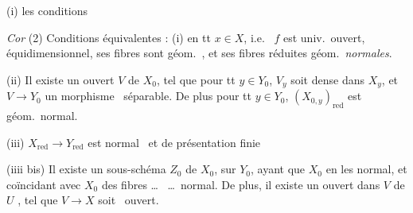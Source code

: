 \documentclass[11pt,a4paper]{article}
\begin{document}

 (i) les conditions  \ill{}

\emph{Cor} (2) Conditions équivalentes : (i) 
en tt $x \in X$, i.e.\  $f$ est univ.\ ouvert,
  équidimensionnel,
 ses fibres sont géom.\ ,
et ses fibres réduites géom.\ \emph{normales}.

(ii) Il existe un ouvert $V$ de $X_0$, tel que pour tt $y \in Y_0$,
$V_y$ soit dense dans $X_y$, et $V \to Y_0$ un morphisme
\ séparable. De plus pour tt
$y \in Y_0$, $(X_{0,y})_{\mathrm{red}}$ est géom.\ normal.

(iii)  $X_{\mathrm{red}} \to Y_{\mathrm{red}}$
 est normal \ et de
présentation finie

(iiii bis) Il existe un sous-schéma \struck{\ill{}} $Z_0$ de $X_0$,
 sur $Y_0$,  ayant \ill{} que
\ill{} $X_0$ en les \ill{} \struck{\ill{}} normal, et coïncidant avec
$X_0$ \ill{} \ill{} des fibres \ldots\  \ldots\ normal. De
plus, il existe un ouvert  dans $V$ de $U$
, tel que $V \to X$ soit \ ouvert.
\end{document}
